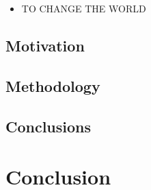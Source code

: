 \documentclass[11pt]{article}
\begin{document}
\begin{itemize}
\item TO CHANGE THE WORLD
\end{itemize}


\subsection{Motivation}


\subsection{Methodology}



\subsection{Conclusions}


\section{Conclusion}



\label{bibliography}
\printbibliography
\end{document}
